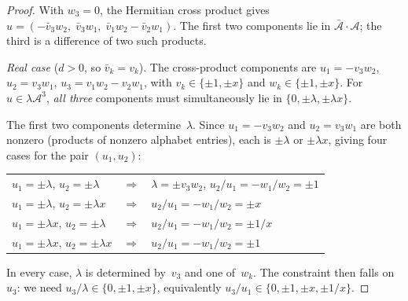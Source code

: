 \documentclass[12pt,a4paper]{article}
\renewcommand{\arraystretch}{1.2}
\begin{document}
\begin{proof}
With $w_3 = 0$, the Hermitian cross product gives
$u = (-\bar{v}_3 w_2,\; \bar{v}_3 w_1,\; \bar{v}_1 w_2 - \bar{v}_2
w_1)$.  The first two components lie in
$\bar{\mathcal{A}} \cdot \mathcal{A}$; the third is a difference of
two such products.

\emph{Real case} ($d > 0$, so $\bar{v}_k = v_k$).
The cross-product components are $u_1 = -v_3 w_2$,
$u_2 = v_3 w_1$, $u_3 = v_1 w_2 - v_2 w_1$, with
$v_k \in \{\pm 1, \pm x\}$ and $w_k \in \{\pm 1, \pm x\}$.
For $u \in \lambda\mathcal{A}^3$, \emph{all three} components must
simultaneously lie in $\{0, \pm\lambda, \pm\lambda x\}$.

The first two components determine~$\lambda$.  Since $u_1 = -v_3 w_2$
and $u_2 = v_3 w_1$ are both nonzero (products of nonzero alphabet
entries), each is $\pm\lambda$ or $\pm\lambda x$, giving four cases
for the pair $(u_1, u_2)$:
\begin{center}
\renewcommand{\arraystretch}{1.1}
\begin{tabular}{@{}lll@{}}
$u_1 = \pm\lambda$, $u_2 = \pm\lambda$ & $\Rightarrow$ & $\lambda = \pm v_3 w_2$,\; $u_2/u_1 = -w_1/w_2 = \pm 1$ \\
$u_1 = \pm\lambda$, $u_2 = \pm\lambda x$ & $\Rightarrow$ & $u_2/u_1 = -w_1/w_2 = \pm x$ \\
$u_1 = \pm\lambda x$, $u_2 = \pm\lambda$ & $\Rightarrow$ & $u_2/u_1 = -w_1/w_2 = \pm 1/x$ \\
$u_1 = \pm\lambda x$, $u_2 = \pm\lambda x$ & $\Rightarrow$ & $u_2/u_1 = -w_1/w_2 = \pm 1$
\end{tabular}
\end{center}
In every case, $\lambda$ is determined by~$v_3$ and one of~$w_k$.
The constraint then falls on~$u_3$: we need
$u_3/\lambda \in \{0, \pm 1, \pm x\}$, equivalently
$u_3/u_1 \in \{0, \pm 1, \pm x, \pm 1/x\}$.


\end{proof}
\end{document}
